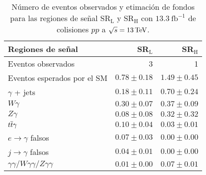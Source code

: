\begin{table}
\centering
\caption{Número de eventos observados y etimación de fondos para las regiones de señal SR$_{\text{L}}$ y SR$_{\text{H}}$ con $13.3 \: \text{fb}^{-1}$ de colisiones $pp$ a $\sqrt{s}=13\, \mathrm{TeV}$\cite{ATLAS:2016fks}. }
\begin{tabular}{ l r r }

	\hline

	Regiones de señal & SR$_{\text{L}}$ &  SR$_{\text{H}}$ \\

	\hline

	Eventos observados & 3 & 1 \\

	\hline

	Eventos esperados por el SM & $0.78 \pm 0.18$ & $1.49 \pm 0.45$\\

	\hline

	$\gamma$ + jets & $0.18 \pm 0.11$ & $0.70 \pm 0.24$\\

	$W\gamma$ & $0.30 \pm 0.07$ & $0.37 \pm 0.09$\\

	$Z\gamma$ & $0.08 \pm 0.08$ & $0.32 \pm 0.32$\\

	$t \overline{t}\gamma$ & $0.10 \pm 0.04$ & $0.03 \pm 0.01$\\

	$e\rightarrow\gamma$ falsos & $0.07 \pm 0.03$ & $0.00 \pm 0.00$\\

	$j\rightarrow\gamma$ falsos & $0.04 \pm 0.01$ & $0.00 \pm 0.00$\\

	$\gamma\gamma / W\gamma\gamma / Z\gamma\gamma$ & $0.01 \pm 0.00$ & $0.07 \pm 0.01$\\

	\hline


\end{tabular}
\label{ta:SRL_SRH}
\end{table}